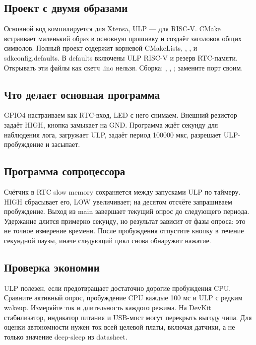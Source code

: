 \subsection{Проект с двумя образами}
Основной код компилируется для Xtensa, ULP --- для RISC-V. CMake встраивает маленький образ
в основную прошивку и создаёт заголовок общих символов.
Полный проект  содержит корневой CMakeLists,
, ,  и sdkconfig.defaults.
В defaults включены ULP RISC-V и резерв RTC-памяти. Открывать эти файлы как скетч .ino нельзя.
Сборка: , ,
; замените порт своим.

\subsection{Что делает основная программа}
GPIO4 настраиваем как RTC-вход, LED с него снимаем. Внешний резистор задаёт HIGH,
кнопка замыкает на GND. Программа ждёт секунду для наблюдения лога, загружает ULP,
задаёт период 100000 мкс, разрешает ULP-пробуждение и засыпает.


\subsection{Программа сопроцессора}

Счётчик в RTC slow memory сохраняется между запусками ULP по таймеру. HIGH сбрасывает его,
LOW увеличивает; на десятом отсчёте запрашиваем пробуждение. Выход из main завершает
текущий опрос до следующего периода. Удержание длится примерно секунду, но результат зависит
от фазы опроса: это не точное измерение времени. После пробуждения отпустите кнопку
в течение секундной паузы, иначе следующий цикл снова обнаружит нажатие.

\subsection{Проверка экономии}
ULP полезен, если предотвращает достаточно дорогие пробуждения CPU.
Сравните активный опрос, пробуждение CPU каждые 100 мс и ULP с редким wakeup.
Измеряйте ток и длительность каждого режима. На DevKit стабилизатор, индикатор питания
и USB-мост могут перекрыть выгоду чипа. Для оценки автономности нужен ток всей целевой платы,
включая датчики, а не только значение deep-sleep из datasheet.

